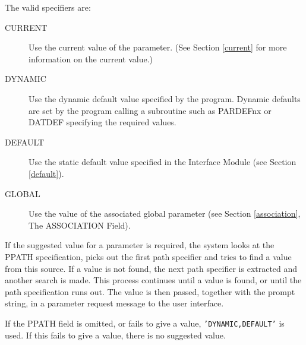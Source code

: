 \documentclass[twoside,11pt]{article}
\renewcommand{\_}{\texttt{\symbol{95}}}
\begin{document}
The valid specifiers are:
\begin{description}
\item[CURRENT] Use the current value of the parameter.
(See Section \ref{current} for more information on the current value.)
\item[DYNAMIC] Use the dynamic default value specified by the program.
Dynamic defaults are set by the program calling a subroutine such as
PAR\_DEFnx or DAT\_DEF specifying the required values.
\item[DEFAULT] Use the static default value specified in the Interface Module
(see Section \ref{default}).
\item[GLOBAL] Use the value of the associated global parameter (see Section
\ref{association}, The ASSOCIATION Field).
\end{description}
If the suggested value for a parameter is required, the system looks at the
PPATH specification, picks out the first path specifier and tries to
find a value from this source. If a value is not found, the next path
specifier is extracted and another search is made. This process
continues until a value is found, or until the path specification runs
out. 
The value is then passed, together with the prompt string,
in a parameter request message to the user interface.

If the PPATH field is omitted, or fails to give a value, 
\texttt{'DYNAMIC,DEFAULT'} is used.
If this fails to give a value, there is no suggested value.
\end{document}
